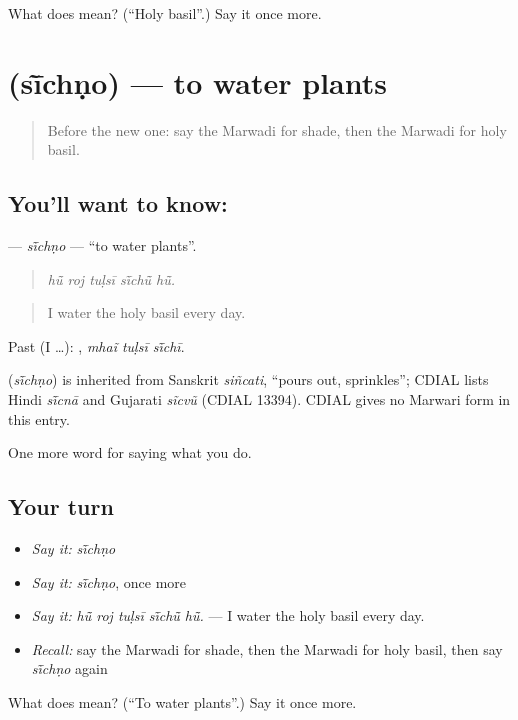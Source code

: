 \begin{tcolorbox}[breakable,colback=teal!4,colframe=teal!35!black,title={Before you move on}]
What does  mean? (\textquotedblleft{}Holy basil\textquotedblright{}.) Say it once more.
\end{tcolorbox}
\section[\texorpdfstring{\mw{सींचणो} (sī̃chṇo)}{सींचणो (sī̃chṇo)}]{ (sī̃chṇo) — to water plants}

\label{lesson:MW-C168-sichno}



\begin{quote}
Before the new one: say the Marwadi for shade, then the Marwadi for holy basil.
\end{quote}

\subsection*{You'll want to know: }
\textbf{} — \emph{sī̃chṇo} — \textquotedblleft{}to water plants\textquotedblright{}.

\begin{quote}
    
\end{quote}

\begin{quote}
\emph{hū̃ roj tuḷsī sī̃chū̃ hū̃.}
\end{quote}

\begin{quote}
I water the holy basil every day.
\end{quote}

Past (I …):   , \emph{mhaĩ tuḷsī sī̃chī}.

\begin{cousinweb}
\textbf{} (\emph{sī̃chṇo}) is inherited from Sanskrit \emph{siñcati}, \textquotedblleft{}pours out, sprinkles\textquotedblright{}; CDIAL lists Hindi \emph{sī̃cnā} and Gujarati \emph{sĩcvũ} (CDIAL 13394). CDIAL gives no Marwari form in this entry.
\end{cousinweb}

\begin{grammarlens}[title={What you've built}]
One more word for saying what you do.
\end{grammarlens}

\subsection*{Your turn}
\begin{itemize}
\raggedright
  \item \emph{Say it:} \emph{sī̃chṇo}
  \item \emph{Say it:} \emph{sī̃chṇo}, once more
  \item \emph{Say it:} \emph{hū̃ roj tuḷsī sī̃chū̃ hū̃.} — I water the holy basil every day.
  \item \emph{Recall:} say the Marwadi for shade, then the Marwadi for holy basil, then say \emph{sī̃chṇo} again
\end{itemize}

\begin{tcolorbox}[breakable,colback=teal!4,colframe=teal!35!black,title={Before you move on}]
What does  mean? (\textquotedblleft{}To water plants\textquotedblright{}.) Say it once more.
\end{tcolorbox}
